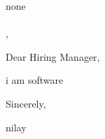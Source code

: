 \documentclass[11pt,a4paper]{letter}
\begin{document}
\begin{letter}{
none\\
\\
, 
}

\address{
nilay\\
\\
, \\
9016989674\\
\href{mailto:nilaypatel@gmail.com}{nilaypatel@gmail.com}
}

\date{April 14, 2025}

\opening{Dear Hiring Manager,}

i am software



\closing{Sincerely,}

\vspace{0.5in}
nilay

\end{letter}
\end{document}
